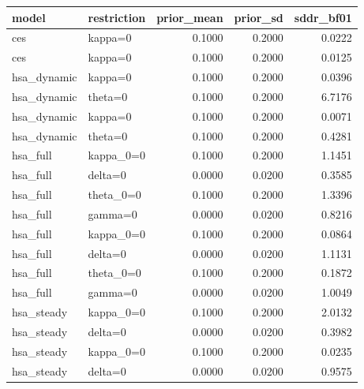 \begin{tabular}{llrrr}
\toprule
model & restriction & prior\_mean & prior\_sd & sddr\_bf01 \\
\midrule
ces & kappa=0 & 0.1000 & 0.2000 & 0.0222 \\
ces & kappa=0 & 0.1000 & 0.2000 & 0.0125 \\
hsa\_dynamic & kappa=0 & 0.1000 & 0.2000 & 0.0396 \\
hsa\_dynamic & theta=0 & 0.1000 & 0.2000 & 6.7176 \\
hsa\_dynamic & kappa=0 & 0.1000 & 0.2000 & 0.0071 \\
hsa\_dynamic & theta=0 & 0.1000 & 0.2000 & 0.4281 \\
hsa\_full & kappa\_0=0 & 0.1000 & 0.2000 & 1.1451 \\
hsa\_full & delta=0 & 0.0000 & 0.0200 & 0.3585 \\
hsa\_full & theta\_0=0 & 0.1000 & 0.2000 & 1.3396 \\
hsa\_full & gamma=0 & 0.0000 & 0.0200 & 0.8216 \\
hsa\_full & kappa\_0=0 & 0.1000 & 0.2000 & 0.0864 \\
hsa\_full & delta=0 & 0.0000 & 0.0200 & 1.1131 \\
hsa\_full & theta\_0=0 & 0.1000 & 0.2000 & 0.1872 \\
hsa\_full & gamma=0 & 0.0000 & 0.0200 & 1.0049 \\
hsa\_steady & kappa\_0=0 & 0.1000 & 0.2000 & 2.0132 \\
hsa\_steady & delta=0 & 0.0000 & 0.0200 & 0.3982 \\
hsa\_steady & kappa\_0=0 & 0.1000 & 0.2000 & 0.0235 \\
hsa\_steady & delta=0 & 0.0000 & 0.0200 & 0.9575 \\
\bottomrule
\end{tabular}
